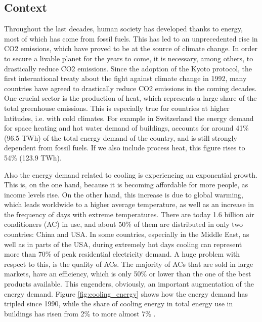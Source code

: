 \documentclass{article}
\begin{document}
\subsection{Context}
Throughout the last decades, human society has developed thanks to energy, most of which has come from fossil fuels. This has led to an unprecedented rise in CO2 emissions, which have proved to be at the source of climate change. In order to secure a livable planet for the years to come, it is necessary, among others, to drastically reduce CO2 emissions\cite{ipccSummaryPolicymakersIPCC2018}. Since the adoption of the Kyoto protocol, the first international treaty about the fight against climate change in 1992, many countries have agreed to drastically reduce CO2 emissions in the coming decades.\\

One crucial sector is the production of heat, which represents a large share of the total greenhouse emissions. This is especially true for countries at higher latitudes, i.e. with cold climates. For example in Switzerland the energy demand for space heating and hot water demand of buildings, accounts for around 41\% (96.5 TWh) of the total energy demand of the country, and is still strongly dependent from fossil fuels. If we also include process heat, this figure rises to 54\% (123.9 TWh)\cite{bacherEnergieRespektSchlusselFur2014}. 

Also the energy demand related to cooling is experiencing an exponential growth. This is, on the one hand, because it is becoming affordable for more people, as income levels rise. On the other hand, this increase is due to global warming, which leads worldwide to a higher average temperature, as well as an increase in the frequency of days with extreme temperatures\cite{ipccSummaryPolicymakersIPCC2018}. There are today 1.6 billion air conditioners (AC) in use, and about 50\% of them are distributed in only two countries: China and USA. In some countries, especially in the Middle East, as well as in parts of the USA, during extremely hot days cooling can represent more than 70\% of peak residential electricity demand. A huge problem with respect to this, is the quality of ACs. The majority of ACs that are sold in large markets, have an efficiency, which is only 50\% or lower than the one of the best products available. This engenders, obviously, an important augmentation of the energy demand. Figure \ref{fig:cooling_energy} shows how the energy demand has tripled since 1990, while the share of cooling energy in total energy use in buildings has risen from 2\% to more almost 7\% \cite{birolFutureCooling2018}. 
\end{document}
